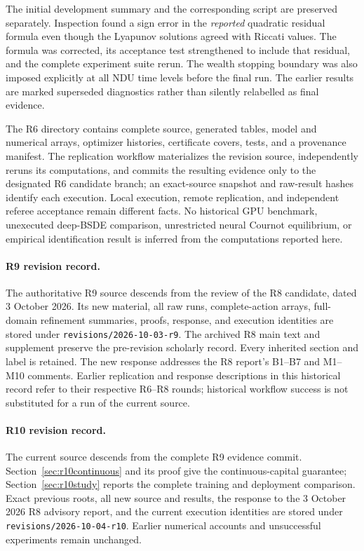 \documentclass[ecta,draft]{econsocart}
\theoremstyle{definition}
\theoremstyle{remark}
\begin{document}
\begin{appendix}
The initial development summary and the corresponding script are preserved separately. Inspection found a sign error in the \emph{reported} quadratic residual formula even though the Lyapunov solutions agreed with Riccati values. The formula was corrected, its acceptance test strengthened to include that residual, and the complete experiment suite rerun. The wealth stopping boundary was also imposed explicitly at all NDU time levels before the final run. The earlier results are marked superseded diagnostics rather than silently relabelled as final evidence.

The R6 directory contains complete source, generated tables, model and numerical arrays, optimizer histories, certificate covers, tests, and a provenance manifest. The replication workflow materializes the revision source, independently reruns its computations, and commits the resulting evidence only to the designated R6 candidate branch; an exact-source snapshot and raw-result hashes identify each execution. Local execution, remote replication, and independent referee acceptance remain different facts. No historical GPU benchmark, unexecuted deep-BSDE comparison, unrestricted neural Cournot equilibrium, or empirical identification result is inferred from the computations reported here.
\end{appendix}
\paragraph{R9 revision record.} The authoritative R9 source descends from the review of the R8 candidate, dated 3 October 2026. Its new material, all raw runs, complete-action arrays, full-domain refinement summaries, proofs, response, and execution identities are stored under \texttt{revisions/2026-10-03-r9}. The archived R8 main text and supplement preserve the pre-revision scholarly record. Every inherited section and label is retained. The new response addresses the R8 report's B1--B7 and M1--M10 comments. Earlier replication and response descriptions in this historical record refer to their respective R6--R8 rounds; historical workflow success is not substituted for a run of the current source.


\paragraph{R10 revision record.} The current source descends from the complete R9 evidence commit. Section~\ref{sec:r10continuous} and its proof give the continuous-capital guarantee; Section~\ref{sec:r10study} reports the complete training and deployment comparison. Exact previous roots, all new source and results, the response to the 3 October 2026 R8 advisory report, and the current execution identities are stored under \texttt{revisions/2026-10-04-r10}. Earlier numerical accounts and unsuccessful experiments remain unchanged.


\end{document}
